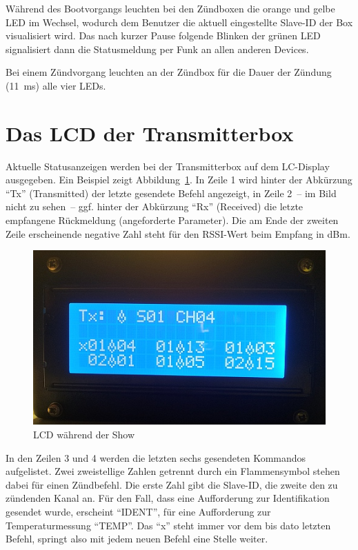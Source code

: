 \documentclass[paper=a4, parskip, numbers=noenddot, toc=listof, headsepline]{scrbook}
\begin{document}
			Während des Bootvorgangs leuchten bei den Zündboxen die orange und gelbe LED im Wechsel, wodurch dem Benutzer die aktuell eingestellte Slave-ID der Box visualisiert wird. Das nach kurzer Pause folgende Blinken der grünen LED signalisiert dann die Statusmeldung per Funk an allen anderen Devices.

			Bei einem Zündvorgang leuchten an der Zündbox für die Dauer der Zündung (\SI{11}{\milli\second}) alle vier LEDs.

		\section{Das LCD der Transmitterbox}

			Aktuelle Statusanzeigen werden bei der Transmitterbox auf dem LC-Display ausgegeben. Ein Beispiel zeigt Abbildung~\ref{fig:senderanzeige}. In Zeile 1 wird hinter der Abkürzung \enquote{Tx} (Transmitted) der letzte gesendete Befehl angezeigt, in Zeile 2~-- im Bild nicht zu sehen~-- ggf. hinter der Abkürzung \enquote{Rx} (Received) die letzte empfangene Rückmeldung (angeforderte Parameter). Die am Ende der zweiten Zeile erscheinende negative Zahl steht für den RSSI-Wert beim Empfang in dBm.

			\begin{figure}
				\centering
				\includegraphics[width=.7\textwidth]{Bilder/SenderAnzeige}
				\caption{LCD während der Show}
				\label{fig:senderanzeige}
			\end{figure}

			In den Zeilen 3 und 4 werden die letzten sechs gesendeten Kommandos aufgelistet. Zwei zweistellige Zahlen getrennt durch ein Flammensymbol stehen dabei für einen Zündbefehl. Die erste Zahl gibt die Slave-ID, die zweite den zu zündenden Kanal an. Für den Fall, dass eine Aufforderung zur Identifikation gesendet wurde, erscheint \enquote{IDENT}, für eine Aufforderung zur Temperaturmessung \enquote{TEMP}. Das \enquote{x} steht immer vor dem bis dato letzten Befehl, springt also mit jedem neuen Befehl eine Stelle weiter.
\end{document}
